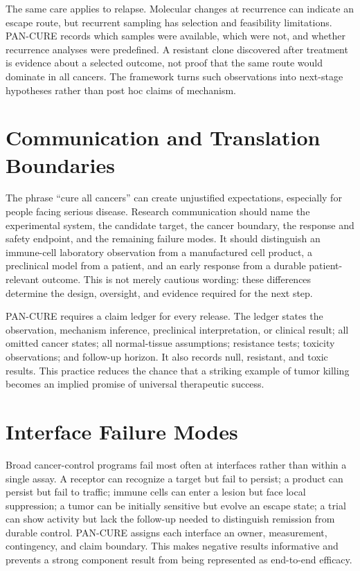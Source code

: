 \documentclass[10pt,conference]{IEEEtran}
\begin{document}
The same care applies to relapse. Molecular changes at recurrence can indicate an escape route, but recurrent sampling has selection and feasibility limitations. PAN-CURE records which samples were available, which were not, and whether recurrence analyses were predefined. A resistant clone discovered after treatment is evidence about a selected outcome, not proof that the same route would dominate in all cancers. The framework turns such observations into next-stage hypotheses rather than post hoc claims of mechanism.

\section{Communication and Translation Boundaries}\label{sec:communication}
The phrase ``cure all cancers'' can create unjustified expectations, especially for people facing serious disease. Research communication should name the experimental system, the candidate target, the cancer boundary, the response and safety endpoint, and the remaining failure modes. It should distinguish an immune-cell laboratory observation from a manufactured cell product, a preclinical model from a patient, and an early response from a durable patient-relevant outcome. This is not merely cautious wording: these differences determine the design, oversight, and evidence required for the next step.

PAN-CURE requires a claim ledger for every release. The ledger states the observation, mechanism inference, preclinical interpretation, or clinical result; all omitted cancer states; all normal-tissue assumptions; resistance tests; toxicity observations; and follow-up horizon. It also records null, resistant, and toxic results. This practice reduces the chance that a striking example of tumor killing becomes an implied promise of universal therapeutic success.

\section{Interface Failure Modes}\label{sec:interfaces}
Broad cancer-control programs fail most often at interfaces rather than within a single assay. A receptor can recognize a target but fail to persist; a product can persist but fail to traffic; immune cells can enter a lesion but face local suppression; a tumor can be initially sensitive but evolve an escape state; a trial can show activity but lack the follow-up needed to distinguish remission from durable control. PAN-CURE assigns each interface an owner, measurement, contingency, and claim boundary. This makes negative results informative and prevents a strong component result from being represented as end-to-end efficacy.
\end{document}
